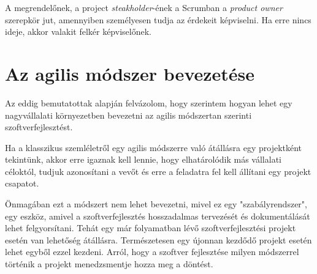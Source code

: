 \documentclass[a4paper,12pt,leqno, notitlepage]{article}%
\begin{document}
A megrendelőnek, a project \emph{steakholder}-ének a Scrumban a \emph{product owner} szerepkör jut, amennyiben személyesen tudja az érdekeit képviselni. Ha erre nincs ideje, akkor valakit felkér képviselőnek. 

\section{Az agilis módszer bevezetése}
\label{sec:AzAgilisModszerBevezetese}

Az eddig bemutatottak alapján felvázolom, hogy szerintem hogyan lehet egy nagyvállalati környezetben bevezetni az agilis módszertan szerinti szoftverfejlesztést.

Ha a klasszikus szemléletről egy agilis módszerre való átállásra egy projektként tekintünk, akkor erre igaznak kell lennie, hogy elhatárolódik más vállalati céloktól, tudjuk azonosítani a vevőt és erre a feladatra fel kell állítani egy projekt csapatot. 

Önmagában ezt a módszert nem lehet bevezetni, mivel ez egy "szabályrendszer", egy eszköz, amivel a szoftverfejlesztés hosszadalmas tervezését és dokumentálását lehet felgyorsítani. Tehát egy már folyamatban lévő szoftverfejlesztési projekt esetén van lehetőség átállásra. Természetesen egy újonnan kezdődő projekt esetén lehet egyből ezzel kezdeni. Arról, hogy a szoftver fejlesztése milyen módszerrel történik a projekt menedzsmentje hozza meg a döntést.

{}

\end{document}
